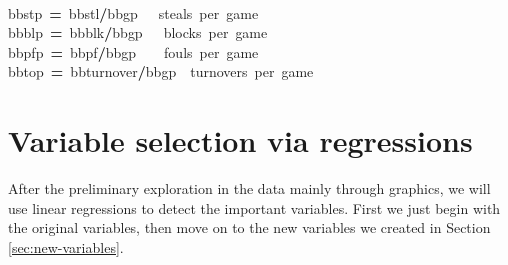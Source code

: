 \documentclass[english]{article}
\newenvironment{dummy}{\par}{\par}
\newcommand{\hlkeyword}[1]{\textcolor[rgb]{0,0,0}{\textbf{#1}}}%
\newcommand{\hlcomment}[1]{\textcolor[rgb]{0.8,0.8,0.8}{#1}}%
\newcommand{\hlassignement}[1]{\textcolor[rgb]{0.215686274509804,0.215686274509804,0.384313725490196}{\textbf{#1}}}%
\newcommand{\hlsymbol}[1]{\textcolor[rgb]{0,0,0}{#1}}%
\newcommand{\hlprompt}[1]{\textcolor[rgb]{0,0,0}{#1}}%
\newcommand{\hlstd}[1]{\textcolor[rgb]{0,0,0}{#1}}%
\begin{document}
\begin{dummy}
\normalfont
\hspace*{\fill}\\
\hlstd{}\ttfamily\noindent
\hlprompt{\usebox{\hlnormalsizeboxgreaterthan}{\ }}\hlsymbol{bb}\hlkeyword{\usebox{\hlnormalsizeboxdollar}}\hlsymbol{stp}{\ }\hlassignement{=}{\ }\hlsymbol{bb}\hlkeyword{\usebox{\hlnormalsizeboxdollar}}\hlsymbol{stl}\hlkeyword{/}\hlsymbol{bb}\hlkeyword{\usebox{\hlnormalsizeboxdollar}}\hlsymbol{gp}{\ }{\ }{\ }\hlcomment{\usebox{\hlnormalsizeboxhash}{\ }steals{\ }per{\ }game}\mbox{}
\normalfont
\hspace*{\fill}\\
\hlstd{}\ttfamily\noindent
\hlprompt{\usebox{\hlnormalsizeboxgreaterthan}{\ }}\hlsymbol{bb}\hlkeyword{\usebox{\hlnormalsizeboxdollar}}\hlsymbol{blp}{\ }\hlassignement{=}{\ }\hlsymbol{bb}\hlkeyword{\usebox{\hlnormalsizeboxdollar}}\hlsymbol{blk}\hlkeyword{/}\hlsymbol{bb}\hlkeyword{\usebox{\hlnormalsizeboxdollar}}\hlsymbol{gp}{\ }{\ }{\ }\hlcomment{\usebox{\hlnormalsizeboxhash}{\ }blocks{\ }per{\ }game}\mbox{}
\normalfont
\hspace*{\fill}\\
\hlstd{}\ttfamily\noindent
\hlprompt{\usebox{\hlnormalsizeboxgreaterthan}{\ }}\hlsymbol{bb}\hlkeyword{\usebox{\hlnormalsizeboxdollar}}\hlsymbol{pfp}{\ }\hlassignement{=}{\ }\hlsymbol{bb}\hlkeyword{\usebox{\hlnormalsizeboxdollar}}\hlsymbol{pf}\hlkeyword{/}\hlsymbol{bb}\hlkeyword{\usebox{\hlnormalsizeboxdollar}}\hlsymbol{gp}{\ }{\ }{\ }{\ }\hlcomment{\usebox{\hlnormalsizeboxhash}{\ }fouls{\ }per{\ }game}\mbox{}
\normalfont
\hspace*{\fill}\\
\hlstd{}\ttfamily\noindent
\hlprompt{\usebox{\hlnormalsizeboxgreaterthan}{\ }}\hlsymbol{bb}\hlkeyword{\usebox{\hlnormalsizeboxdollar}}\hlsymbol{top}{\ }\hlassignement{=}{\ }\hlsymbol{bb}\hlkeyword{\usebox{\hlnormalsizeboxdollar}}\hlsymbol{turnover}\hlkeyword{/}\hlsymbol{bb}\hlkeyword{\usebox{\hlnormalsizeboxdollar}}\hlsymbol{gp}{\ }{\ }\hlcomment{\usebox{\hlnormalsizeboxhash}{\ }turnovers{\ }per{\ }game}\mbox{}
\normalfont
\hspace*{\fill}\\
\hlstd{}
\end{dummy}

\section{Variable selection via regressions\label{sec:regression}}

After the preliminary exploration in the data mainly through graphics,
we will use linear regressions to detect the important variables.
First we just begin with the original variables, then move on to the
new variables we created in Section \ref{sec:new-variables}.
\end{document}
